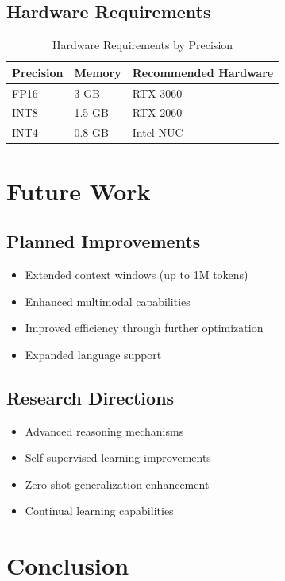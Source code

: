 \documentclass[11pt,a4paper]{article}
\begin{document}
\subsection{Hardware Requirements}
\begin{table}[H]
\centering
\begin{tabular}{lll}
\toprule
\textbf{Precision} & \textbf{Memory} & \textbf{Recommended Hardware} \\
\midrule
FP16 & 3 GB & RTX 3060 \\
INT8 & 1.5 GB & RTX 2060 \\
INT4 & 0.8 GB & Intel NUC \\
\bottomrule
\end{tabular}
\caption{Hardware Requirements by Precision}
\end{table}

\section{Future Work}

\subsection{Planned Improvements}
\begin{itemize}
    \item Extended context windows (up to 1M tokens)
    \item Enhanced multimodal capabilities
    \item Improved efficiency through further optimization
    \item Expanded language support
\end{itemize}

\subsection{Research Directions}
\begin{itemize}
    \item Advanced reasoning mechanisms
    \item Self-supervised learning improvements
    \item Zero-shot generalization enhancement
    \item Continual learning capabilities
\end{itemize}

\section{Conclusion}
\end{document}
